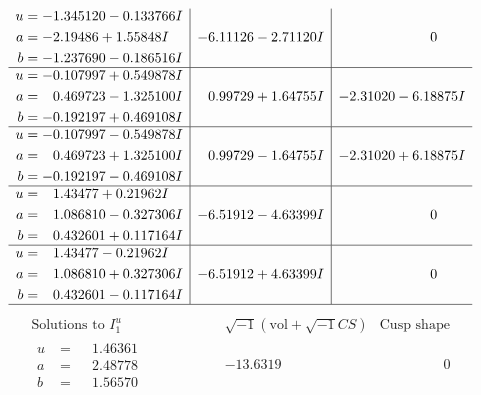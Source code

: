 \documentclass[1p]{elsarticle_modified}
\theoremstyle{definition}
\newcommand{\I}{\sqrt{-1}}
\begin{document}
$$\begin{array}{c|c|c}
\begin{aligned}
u &= -1.345120 - 0.133766 I \\
a &= -2.19486 + 1.55848 I \\
b &= -1.237690 - 0.186516 I\end{aligned}
 & -6.11126 - 2.71120 I & \phantom{-0.000000 } 0 \\ \hline\begin{aligned}
u &= -0.107997 + 0.549878 I \\
a &= \phantom{-}0.469723 - 1.325100 I \\
b &= -0.192197 + 0.469108 I\end{aligned}
 & \phantom{-}0.99729 + 1.64755 I & -2.31020 - 6.18875 I \\ \hline\begin{aligned}
u &= -0.107997 - 0.549878 I \\
a &= \phantom{-}0.469723 + 1.325100 I \\
b &= -0.192197 - 0.469108 I\end{aligned}
 & \phantom{-}0.99729 - 1.64755 I & -2.31020 + 6.18875 I \\ \hline\begin{aligned}
u &= \phantom{-}1.43477 + 0.21962 I \\
a &= \phantom{-}1.086810 - 0.327306 I \\
b &= \phantom{-}0.432601 + 0.117164 I\end{aligned}
 & -6.51912 - 4.63399 I & \phantom{-0.000000 } 0 \\ \hline\begin{aligned}
u &= \phantom{-}1.43477 - 0.21962 I \\
a &= \phantom{-}1.086810 + 0.327306 I \\
b &= \phantom{-}0.432601 - 0.117164 I\end{aligned}
 & -6.51912 + 4.63399 I & \phantom{-0.000000 } 0\\
 \hline 
 \end{array}$$\newpage$$\begin{array}{c|c|c}  
\text{Solutions to }I^u_{1}& \I (\text{vol} + \sqrt{-1}CS) & \text{Cusp shape}\\
 \hline 
\begin{aligned}
u &= \phantom{-}1.46361\phantom{ +0.000000I} \\
a &= \phantom{-}2.48778\phantom{ +0.000000I} \\
b &= \phantom{-}1.56570\phantom{ +0.000000I}\end{aligned}
 & -13.6319\phantom{ +0.000000I} & \phantom{-0.000000 } 0 \\ \hline\begin{aligned}

\end{aligned}
\end{array}$$
\end{document}
